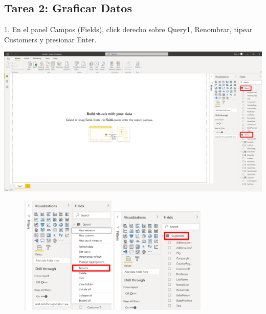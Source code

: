 \documentclass[12pt,letterpaper]{article}
\begin{document}
\subsection*{Tarea 2: Graficar Datos}
1. En el panel Campos (Fields), click derecho sobre Query1, Renombrar, tipear Customers y presionar Enter.
\begin{center}
    \includegraphics[width=16cm]{img/17.png}  
\end{center}
\begin{figure}[!tbp]
    \centering
    \includegraphics[width=0.4\textwidth]{img/18.png}
    \hfill
    \includegraphics[width=0.4\textwidth]{img/19.png}
    \caption{}
  \end{figure}
\end{document}
